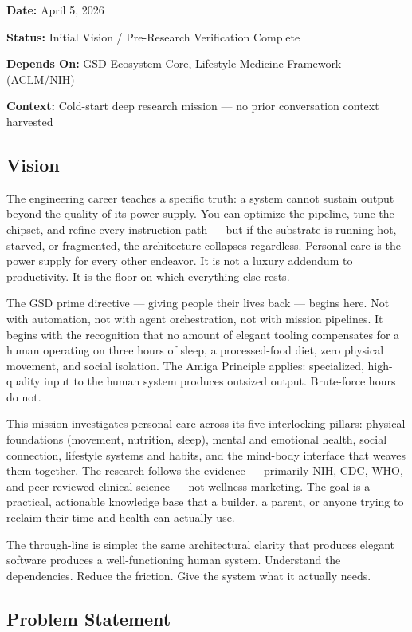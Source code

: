 \documentclass[11pt,letterpaper]{article}
\newcommand{\metafield}[2]{\textbf{\sffamily #1} #2\par}
\begin{document}
\metafield{Date:}{April 5, 2026}
\metafield{Status:}{Initial Vision / Pre-Research Verification Complete}
\metafield{Depends On:}{GSD Ecosystem Core, Lifestyle Medicine Framework (ACLM/NIH)}
\metafield{Context:}{Cold-start deep research mission --- no prior conversation context harvested}

\subsection{Vision}

The engineering career teaches a specific truth: a system cannot sustain output beyond the quality of its power supply. You can optimize the pipeline, tune the chipset, and refine every instruction path --- but if the substrate is running hot, starved, or fragmented, the architecture collapses regardless. Personal care is the power supply for every other endeavor. It is not a luxury addendum to productivity. It is the floor on which everything else rests.

The GSD prime directive --- giving people their lives back --- begins here. Not with automation, not with agent orchestration, not with mission pipelines. It begins with the recognition that no amount of elegant tooling compensates for a human operating on three hours of sleep, a processed-food diet, zero physical movement, and social isolation. The Amiga Principle applies: specialized, high-quality input to the human system produces outsized output. Brute-force hours do not.

This mission investigates personal care across its five interlocking pillars: physical foundations (movement, nutrition, sleep), mental and emotional health, social connection, lifestyle systems and habits, and the mind-body interface that weaves them together. The research follows the evidence --- primarily NIH, CDC, WHO, and peer-reviewed clinical science --- not wellness marketing. The goal is a practical, actionable knowledge base that a builder, a parent, or anyone trying to reclaim their time and health can actually use.

The through-line is simple: the same architectural clarity that produces elegant software produces a well-functioning human system. Understand the dependencies. Reduce the friction. Give the system what it actually needs.

\subsection{Problem Statement}
\end{document}
